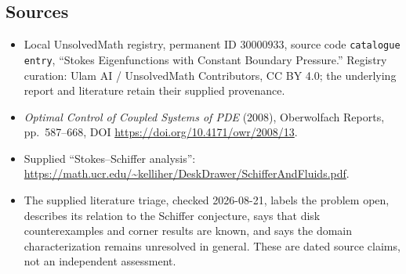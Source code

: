 \documentclass[11pt]{article}
\begin{document}
\subsection{Sources}
\begin{itemize}
\item Local UnsolvedMath registry, permanent ID \(30000933\), source code \texttt{catalogue entry}, ``Stokes Eigenfunctions with Constant Boundary Pressure.'' Registry curation: Ulam AI / UnsolvedMath Contributors, CC BY 4.0; the underlying report and literature retain their supplied provenance.
\item \emph{Optimal Control of Coupled Systems of PDE} (2008), Oberwolfach Reports, pp.\ 587--668, DOI \url{https://doi.org/10.4171/owr/2008/13}.
\item Supplied ``Stokes--Schiffer analysis'': \url{https://math.ucr.edu/~kelliher/DeskDrawer/SchifferAndFluids.pdf}.
\item The supplied literature triage, checked 2026-08-21, labels the problem open, describes its relation to the Schiffer conjecture, says that disk counterexamples and corner results are known, and says the domain characterization remains unresolved in general. These are dated source claims, not an independent assessment.
\end{itemize}
\end{document}
